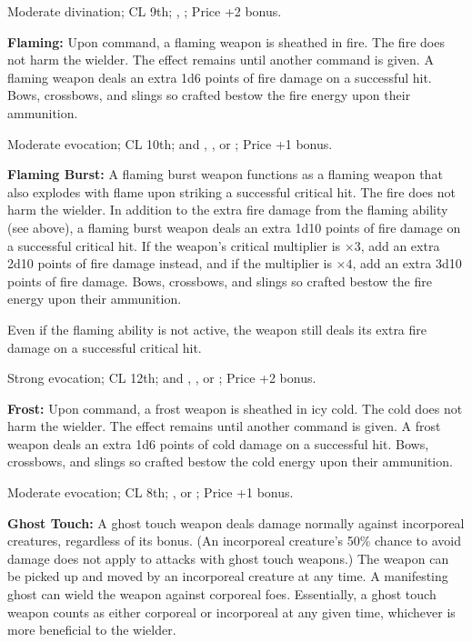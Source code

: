 Moderate divination; CL 9th; , ; Price +2 bonus.


\textbf{Flaming:} Upon command, a flaming weapon is sheathed in fire. The fire does not harm the wielder. The effect remains until another command is given. A flaming weapon deals an extra 1d6 points of fire damage on a successful hit. Bows, crossbows, and slings so crafted bestow the fire energy upon their ammunition.

Moderate evocation; CL 10th;  and , , or ; Price +1 bonus.


\textbf{Flaming Burst:} A flaming burst weapon functions as a flaming weapon that also explodes with flame upon striking a successful critical hit. The fire does not harm the wielder. In addition to the extra fire damage from the flaming ability (see above), a flaming burst weapon deals an extra 1d10 points of fire damage on a successful critical hit. If the weapon's critical multiplier is $\times3$, add an extra 2d10 points of fire damage instead, and if the multiplier is $\times4$, add an extra 3d10 points of fire damage. Bows, crossbows, and slings so crafted bestow the fire energy upon their ammunition.

Even if the flaming ability is not active, the weapon still deals its extra fire damage on a successful critical hit.

Strong evocation; CL 12th;  and , , or ; Price +2 bonus.


\textbf{Frost:} Upon command, a frost weapon is sheathed in icy cold. The cold does not harm the wielder. The effect remains until another command is given. A frost weapon deals an extra 1d6 points of cold damage on a successful hit. Bows, crossbows, and slings so crafted bestow the cold energy upon their ammunition.

Moderate evocation; CL 8th; ,  or ; Price +1 bonus.


\textbf{Ghost Touch:} A ghost touch weapon deals damage normally against incorporeal creatures, regardless of its bonus. (An incorporeal creature's 50\% chance to avoid damage does not apply to attacks with ghost touch weapons.) The weapon can be picked up and moved by an incorporeal creature at any time. A manifesting ghost can wield the weapon against corporeal foes. Essentially, a ghost touch weapon counts as either corporeal or incorporeal at any given time, whichever is more beneficial to the wielder.


